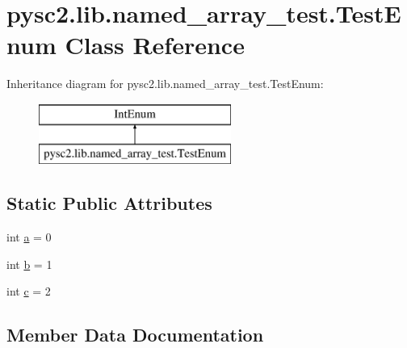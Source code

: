 \hypertarget{classpysc2_1_1lib_1_1named__array__test_1_1_test_enum}{}\section{pysc2.\+lib.\+named\+\_\+array\+\_\+test.\+Test\+Enum Class Reference}
\label{classpysc2_1_1lib_1_1named__array__test_1_1_test_enum}
Inheritance diagram for pysc2.\+lib.\+named\+\_\+array\+\_\+test.\+Test\+Enum\+:\begin{figure}[H]
\begin{center}
\leavevmode
\includegraphics[height=2.000000cm]{classpysc2_1_1lib_1_1named__array__test_1_1_test_enum}
\end{center}
\end{figure}
\subsection*{Static Public Attributes}
\begin{DoxyCompactItemize}
\item 
int \mbox{\hyperlink{classpysc2_1_1lib_1_1named__array__test_1_1_test_enum_a7e24025574b4a7063ff4b37596fdc116}{a}} = 0
\item 
int \mbox{\hyperlink{classpysc2_1_1lib_1_1named__array__test_1_1_test_enum_af2f301d69fff844af3a84fb02a336ee3}{b}} = 1
\item 
int \mbox{\hyperlink{classpysc2_1_1lib_1_1named__array__test_1_1_test_enum_a7667f9b18c7673e513dd2de4043d7d93}{c}} = 2
\end{DoxyCompactItemize}


\subsection{Member Data Documentation}
\mbox{\label{classpysc2_1_1lib_1_1named__array__test_1_1_test_enum_a7e24025574b4a7063ff4b37596fdc116}} 
